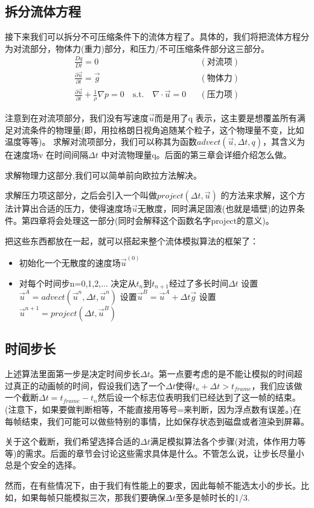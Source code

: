 \documentclass{article}
\begin{document}
\subsection{拆分流体方程}
\par
接下来我们可以拆分不可压缩条件下的流体方程了。具体的，我们将把流体方程分为对流部分，物体力(重力)部分，和压力/不可压缩条件部分这三部分。
\begin{equation}
\begin{aligned}
\frac{Dq}{Dt}=0    &&(\mbox{对流项})\\
\frac{\partial{\vec{u}}}{\partial{t}}=\vec{g} &&(\mbox{物体力})\\
\frac{\partial{\vec{u}}}{\partial{t}}+\frac{1}{\rho}\nabla{p}=0\quad \mbox{s.t.}\quad \nabla\cdot\vec{u}=0 &&(\mbox{压力项})
\end{aligned}
\end{equation}
\par
注意到在对流项部分，我们没有写速度$\vec{u}$而是用了q 表示，这主要是想覆盖所有满足对流条件的物理量(即，用拉格朗日视角追随某个粒子，这个物理量不变，比如温度等等)。
求解对流项部分，我们可以称其为函数$advect(\vec{u},\Delta{t},q)$，其含义为在速度场v 在时间间隔$\Delta{t}$ 中对流物理量q。后面的第三章会详细介绍怎么做。

求解物理力这部分,我们可以简单前向欧拉方法解决。

求解压力项这部分，之后会引入一个叫做$project(\Delta{t},\vec{u})$ 的方法来求解，这个方法计算出合适的压力，使得速度场$\vec{u}$无散度，同时满足固液(也就是墙壁)的边界条件。第四章将会处理这一部分(同时会解释这个函数名字project的意义)。
\par
把这些东西都放在一起，就可以搭起来整个流体模拟算法的框架了：
\begin{itemize}
\item 初始化一个无散度的速度场$\vec{u}^{(0)}$
\item 对每个时间步n=0,1,2,...
\subitem 决定从$t_n$到$t_{n+1}$经过了多长时间$\Delta{t}$
\subitem 设置$\vec{u}^A=advect(\vec{u}^n,\Delta{t},\vec{u}^n)$
\subitem 设置$\vec{u}^B=\vec{u}^A+\Delta{t}\vec{g}$
\subitem 设置$\vec{u}^{n+1}=project(\Delta{t},\vec{u}^B)$
\end{itemize}
\subsection{时间步长}
上述算法里面第一步是决定时间步长$\Delta{t}$。第一点要考虑的是不能让模拟的时间超过真正的动画帧的时间，假设我们选了一个$\Delta{t}$使得$t_n+\Delta{t}>t_{frame}$，我们应该做一个截断$\Delta{t}=t_{frame}-t_n$然后设一个标志位表明我们已经达到了这一帧的结束。(注意下，如果要做判断相等，不能直接用等号=来判断，因为浮点数有误差。)在每帧结束，我们可能可以做些特别的事情，比如保存状态到磁盘或者渲染到屏幕。
\par
关于这个截断，我们希望选择合适的$\Delta{t}$满足模拟算法各个步骤(对流，体作用力等等)的需求。后面的章节会讨论这些需求具体是什么。不管怎么说，让步长尽量小总是个安全的选择。
\par
然而，在有些情况下，由于我们有性能上的要求，因此每帧不能选太小的步长。比如，如果每帧只能模拟三次，那我们要确保$\Delta{t}$至多是帧时长的1/3.
\end{document}
